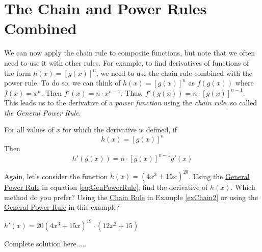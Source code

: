 \section*{The Chain and Power Rules Combined\footnotemark[1]}

We can now apply the chain rule to composite functions, but note that we often need to use it with other rules. For example, to find derivatives of functions of the form $h(x)=[g(x)]^n$, we need to use the chain rule combined with the power rule. To do so, we can think of $h(x)=[g(x)]^n$ as $f(g(x))$ where $f(x)=x^n$. Then \(f'(x)=n \cdot x^{n-1}\). Thus, $f'(g(x))=n \cdot [g(x)]^{n-1}$. This leads us to the derivative of a \emph{power function} using the \emph{chain rule}, so called \emph{the General Power Rule}.
\begin{tcolorbox}[title = {The General Power Rule}]

\noindent For all values of $x$ for which the derivative is defined, if
\vspace{-0.25cm}
\begin{equation}\label{eq:powerFn}
h(x)=[g(x)]^n
\end{equation}
Then
\begin{equation}\label{eq:GenPowerRule}
h'(g(x))=n \cdot [g(x)]^{n-1} g'(x)
\end{equation}

\end{tcolorbox}

\vspace{-0.2cm}
\begin{example}\label{exGenPowerRule1}
Again, let's consider the function $h(x)=(4x^3+15x)^{20}$. Using the \underline{General Power Rule} in equation \ref{eq:GenPowerRule}, find the derivative of $h(x)$. Which method do you prefer? Using the \underline{Chain Rule} in Example \ref{exChain2} or using the \underline{General Power Rule} in this example?
    \begin{sol}
    $h'(x)=20(4x^3+15x)^{19}\cdot (12x^2+15)$
    \end{sol}
    \begin{solL}
    Complete solution here.....
    
    \end{solL}
    
\end{example}
\vspace{0.8in}


